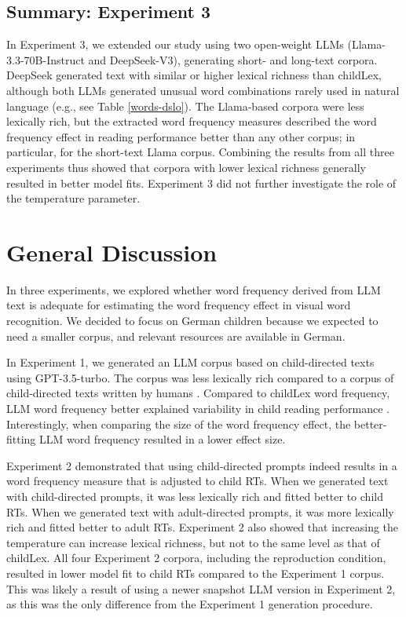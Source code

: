 \documentclass[doc, a4paper, anonymous]{apa7}
\begin{document}
\subsection*{Summary: Experiment 3}

In Experiment 3, we extended our study using two open-weight LLMs (Llama-3.3-70B-Instruct and DeepSeek-V3), generating short- and long-text corpora. DeepSeek generated text with similar or higher lexical richness than childLex, although both LLMs generated unusual word combinations rarely used in natural language (e.g., see Table \ref{words-dslo}). The Llama-based corpora were less lexically rich, but the extracted word frequency measures described the word frequency effect in reading performance better than any other corpus; in particular, for the short-text Llama corpus. Combining the results from all three experiments thus showed that corpora with lower lexical richness generally resulted in better model fits. Experiment 3 did not further investigate the role of the temperature parameter. 


\section*{General Discussion}

In three experiments, we explored whether word frequency derived from LLM text is adequate for estimating the word frequency effect in visual word recognition. We decided to focus on German children because we expected to need a smaller corpus, and relevant resources are available in German. 

In Experiment 1, we generated an LLM corpus based on child-directed texts using GPT-3.5-turbo. The corpus was less lexically rich compared to a corpus of child-directed texts written by humans \citep[childLex; ][]{schroeder_childlex_2015}. Compared to childLex word frequency, LLM word frequency better explained variability in child reading performance \citep[lexical decision reaction times for 1000+ words taken from DeveL; ][]{schroter_developmental_2017}. Interestingly, when comparing the size of the word frequency effect, the better-fitting LLM word frequency resulted in a lower effect size.   

Experiment 2 demonstrated that using child-directed prompts indeed results in a word frequency measure that is adjusted to child RTs. When we generated text with child-directed prompts, it was less lexically rich and fitted better to child RTs. When we generated text with adult-directed prompts, it was more lexically rich and fitted better to adult RTs. Experiment 2 also showed that increasing the temperature can increase lexical richness, but not to the same level as that of childLex. All four Experiment 2 corpora, including the reproduction condition, resulted in lower model fit to child RTs compared to the Experiment 1 corpus. This was likely a result of using a newer snapshot LLM version in Experiment 2, as this was the only difference from the Experiment 1 generation procedure.
\end{document}

